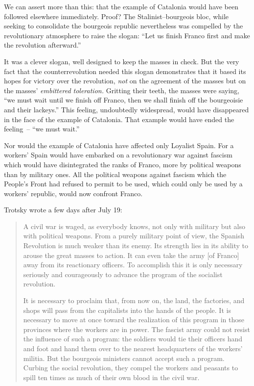 \vspace{-1pt}

We can assert more than this: that the example of Catalonia would have been followed elsewhere immediately. Proof? The Stalinist--bourgeois bloc, while seeking to consolidate the bourgeois republic nevertheless was compelled by the revolutionary atmosphere to raise the slogan: ``Let us finish Franco first and make the revolution afterward.\kn\kn''

\vspace{-1pt}

It was a clever slogan, well designed to keep the masses in check. But the very fact that the counterrevolution needed this slogan dem\-on\-strates that it based its hopes for victory over the revolution, \emph{not} on the agreement of the masses but on the masses’ \emph{embittered toleration.} Gritting their teeth, the masses were saying, ``we must wait until we finish off Franco, then we shall finish off the bourgeoisie and their lackeys.\kn\kn'' This feeling, undoubtedly widespread, would have disappeared in the face of the example of Catalonia. That example would have ended the feeling~-- ``we must wait.\kn\kn''

\vspace{-1pt}

Nor would the example of Catalonia have affected only Loyalist Spain. For a workers’ Spain would have embarked on a revolutionary war against fascism which would have disintegrated the ranks of Franco, more by political weapons than by military ones. All the political weapons against fascism which the People’s Front had refused to permit to be used, which could only be used by a workers’ republic, would now confront Franco.

\smallskip

Trotsky wrote a few days after July 19:


\begin{quotation}
  A civil war is waged, as everybody knows, not only with military but also with political weapons. From a purely military point of view, the Spanish Revolution is much weaker than its enemy. Its strength lies in its ability to arouse the great masses to action. It can even take the army [of Franco] away from its reactionary officers. To accomplish this it is only necessary seriously and courageously to advance the program of the socialist revolution.

  It is necessary to proclaim that, from now on, the land, the factories, and shops will pass from the capitalists into the hands of the people. It is necessary to move at once toward the realization of this program in those provinces where the workers are in power. The fascist army could not resist the influence of such a program: the soldiers would tie their officers hand and foot and hand them over to the nearest headquarters of the workers’ militia. But the bourgeois ministers cannot accept such a program. Curbing the social revolution, they compel the workers and peasants to spill ten times as much of their own blood in the civil war.
\end{quotation}

